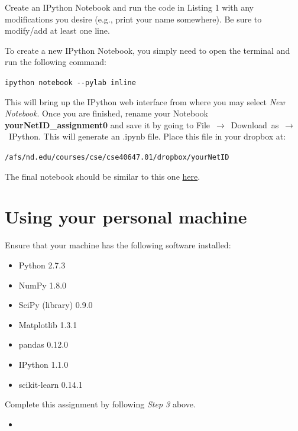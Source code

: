 \documentclass[paper=a4, fontsize=11pt]{scrartcl} %
\numberwithin{equation}{section} %
\numberwithin{figure}{section} %
\numberwithin{table}{section} %
\newcommand{\perlscript}[2]{
\begin{itemize}
\item[]
\end{itemize}
}
\begin{document}
Create an IPython Notebook and run the code in Listing 1 with any modifications you desire (e.g., print your name somewhere). Be sure to modify/add at least one line.

\vspace{8pt}

To create a new IPython Notebook, you simply need to open the terminal and run the following command:

\begin{center}
\texttt{ipython notebook \--\--pylab inline}
\end{center}

This will bring up the IPython web interface from where you may select \textit{New Notebook}. Once you are finished, rename your Notebook \textbf{yourNetID\_assignment0} and save it by going to \mbox{File $\rightarrow$ Download as $\rightarrow$ IPython}. This will generate an .ipynb file. Place this file in your dropbox at:

\begin{center}
\texttt{/afs/nd.edu/courses/cse/cse40647.01/dropbox/yourNetID}
\end{center}

The final notebook should be similar to this one \href{http://nbviewer.ipython.org/github/cse40647/cse40647/blob/sp.14/assignment0/assignment0_sol.ipynb}{here}.

\clearpage
\section{Using your personal machine}

Ensure that your machine has the following software installed:

\begin{itemize}
\item Python 2.7.3
\item NumPy 1.8.0
\item SciPy (library) 0.9.0
\item Matplotlib 1.3.1
\item pandas 0.12.0
\item IPython 1.1.0
\item scikit-learn 0.14.1
\end{itemize}

Complete this assignment by following \textit{Step 3} above.

\clearpage

\perlscript{code}{Sample Python code for testing required modules}
\end{document}

